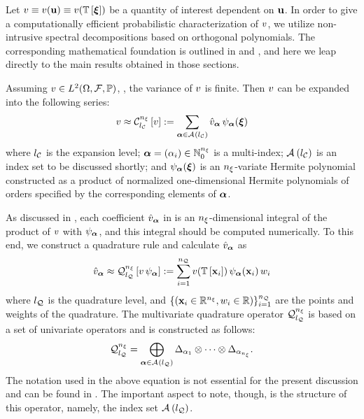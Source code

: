 Let $\w \equiv \w(\vu) \equiv \w(\transformation{\vz})$ be a quantity of interest dependent on $\mathbf{u}$.
In order to give a computationally efficient probabilistic characterization of $v$, we utilize non-intrusive spectral decompositions based on orthogonal polynomials.
The corresponding mathematical foundation is outlined in  and , and here we leap directly to the main results obtained in those sections.

Assuming $v \in L^{2}(\Omega, \mathcal{F}, \mathbb{P})$, \ie, the variance of $v$ is finite.
Then $v$ can be expanded into the following series:
\begin{equation} \elab{spectral-decomposition}
  \w \approx \chaos{\nvars}{\nclevel}{\w} := \sum_{\multiindex \in \chaosMultiindexSet{\nclevel}} \coefficient{\w}_{\multiindex} \, \polynomial_{\multiindex}(\vz)
\end{equation}
where ${l_\mathcal{C}}$ is the expansion level; $\bm{\alpha} = (\alpha_i) \in \mathbb{N}_{0}^{n_\xi}$ is a multi-index; $\mathcal{A}_{}\left( {l_\mathcal{C}} \right)$ is an index set to be discussed shortly; and $\psi_{\bm{\alpha}}(\bm{\xi})$ is an ${n_\xi}$-variate Hermite polynomial constructed as a product of normalized one-dimensional Hermite polynomials of orders specified by the corresponding elements of $\bm{\alpha}$.

As discussed in , each coefficient $\hat{v}_{\bm{\alpha}}$ in  is an ${n_\xi}$-dimensional integral of the product of $v$ with $\psi_{\bm{\alpha}}$, and this integral should be computed numerically.
To this end, we construct a quadrature rule and calculate $\hat{v}_{\bm{\alpha}}$ as
\begin{equation} \elab{numerical-integration}
  \coefficient{\w}_{\multiindex} \approx \quadrature{\nvars}{\nqlevel}{\w \, \polynomial_{\multiindex}} := \sum_{i = 1}^\nqorder \w(\transformation{\point_i}) \, \polynomial_{\multiindex}(\point_i) \, \weight_i
\end{equation}
where ${l_\mathcal{Q}}$ is the quadrature level, and $\{ (\mathbf{x}_i \in \mathbb{R}^{n_\xi}, w_i \in \mathbb{R}) \}_{i = 1}^{n_\mathcal{Q}}$ are the points and weights of the quadrature.
The multivariate quadrature operator $\quadrature$ is based on a set of univariate operators and is constructed as follows:
\begin{equation} \elab{smolyak-sparse-grid}
  \quadrature = \bigoplus_{\multiindex \in \quadratureMultiindexSet{\nqlevel}} \Delta_{\alpha_1} \otimes \cdots \otimes \Delta_{\alpha_\nvars}.
\end{equation}
The notation used in the above equation is not essential for the present discussion and can be found in .
The important aspect to note, though, is the structure of this operator, namely, the index set $\mathcal{A}_{}\left( {l_\mathcal{Q}} \right)$.

